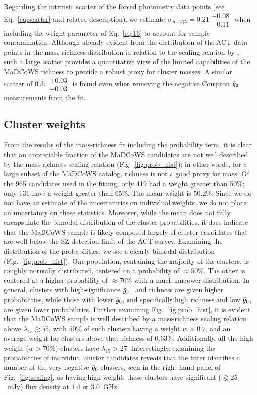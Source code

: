 \documentclass[longauth]{aa} %
\newcommand{\madcows}{MaDCoWS\xspace}
\newcommand{\yc}{$\Tilde{\vary}_0$\xspace}
\begin{document}
Regarding the intrinsic scatter of the forced photometry data points (see Eq.~\eqref{eq:scatter} and related description), we estimate $\sigma_{\ln{M}|\lambda}=0.21\substack{+0.08\\-0.11}$ when including the weight parameter of Eq.~\ref{eq:16} to account for sample contamination.
Although already evident from the distribution of the ACT data points in the mass-richness distribution in relation to the scaling relation by \citet{Gonzalez2019}, such a large scatter provides a quantitative view of the limited capabilities of the MaDCoWS richness to provide a robust proxy for cluster masses. A similar scatter of $0.31\substack{+0.03\\-0.03}$ 
is found even when removing the negative Compton $\Tilde{\vary}_0$ measurements from the fit.



\subsection{Cluster weights} \label{sec:weights}

From the results of the mass-richness fit including the probability term, it is clear that an appreciable fraction of the \madcows candidates are not well described by the mass-richness scaling relation (Fig.~\ref{fig:prob_hist}); in other words, for a large subset of the \madcows catalog, richness is not a good proxy for mass.  Of the 965 candidates used in the fitting, only 419 had a weight greater than 50\%; only 131 have a weight greater than 65\%. The mean weight is $50.2\%$. Since we do not have an estimate of the uncertainties on individual weights, we do not place an uncertainty on these statistics. Moreover, while the mean does not fully encapsulate the bimodal distribution of the cluster probabilities, it does indicate that the \madcows sample is likely composed largely of  cluster candidates that are well below the SZ detection limit of the ACT survey. 
Examining the distribution of the probabilities, we see a clearly bimodal distribution (Fig.~\ref{fig:prob_hist}). One population, containing the majority of the clusters, is roughly normally distributed, centered on a probability of $\approx 50\%$. The other is centered at a higher probability of $\approx 70\%$ with a much narrower distribution. In general, clusters with high-significance \yc[] and richness are given higher probabilities, while those with lower \yc, and specifically high richness and low \yc, are given lower probabilities. Further examining Fig.~\ref{fig:prob_hist}, it is evident that the \madcows sample is well described by a mass-richness scaling relation above $\lambda_{15} \gtrsim 55$, with $50$\% of such clusters having a weight $w > 0.7$, and an average weight for clusters above that richness of $0.63\%$. Additionally,  all the high weight ($w >70\%$) clusters have $\lambda_{15} > 27$. Interestingly, examining the probabilities of individual cluster candidates reveals that the fitter identifies a number of the very negative \yc clusters, seen in the right hand panel of Fig.~\ref{fig:scaling}, as having high weight: these clusters have significant ($\gtrapprox25$~mJy) flux density at $1.4$ or $3.0$~GHz. 
\end{document}
